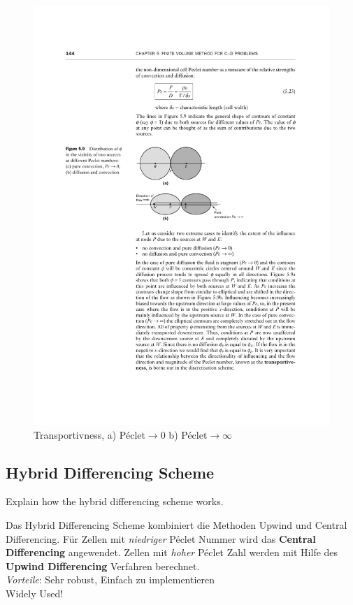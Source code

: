 \documentclass[a4paper]{scrartcl}
\begin{document}
\begin{figure}[h!]
\begin{center}
\includegraphics[scale=1.0]{images/55.pdf}
\caption{Transportivness, a) Péclet$\to$0 b) Péclet$\to \infty$}
\label{fig:55}
\end{center}
\end{figure}


\subsection{Hybrid Differencing Scheme} 
Explain how the hybrid differencing scheme works.

Das Hybrid Differencing Scheme kombiniert die Methoden Upwind und Central
Differencing. Für Zellen mit \textit{niedriger} Péclet Nummer wird das
\textbf{Central Differencing} angewendet. Zellen mit \textit{hoher} Péclet Zahl
werden mit Hilfe des \textbf{Upwind Differencing} Verfahren berechnet.\\
\textit{Vorteile}: Sehr robust, Einfach zu implementieren\\
Widely Used!
\end{document}
